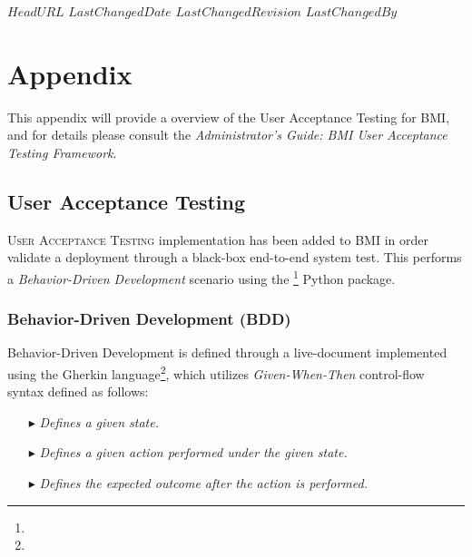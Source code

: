 \svnidlong
{$HeadURL$}
{$LastChangedDate$}
{$LastChangedRevision$}
{$LastChangedBy$}

\chapter{Appendix}

\begin{introduction}
  This appendix will provide a overview of the User Acceptance Testing for BMI, and for details please consult the \emph{Administrator's Guide: BMI User Acceptance Testing Framework}.
\end{introduction}

\section{User Acceptance Testing}

\lettrine[nindent=-1pt]{U}{ser Acceptance Testing} implementation has been added to BMI in order validate a deployment through a black-box end-to-end system test.  This performs a \emph{Behavior-Driven Development} scenario using the \footnote{} Python package.  

\subsection{Behavior-Driven Development (BDD)}

Behavior-Driven Development is defined through a live-document implemented using the Gherkin language\footnote{}, which utilizes \emph{Given-When-Then} control-flow syntax defined as follows: \\

\begin{itemize}
\item[\code{Given }$\blacktriangleright$\hspace{-12mm}] \hspace{10mm}\emph{Defines a given state.}
\item[\code{When }$\blacktriangleright$\hspace{-12mm}] \hspace{10mm}\emph{Defines a given action performed under the given state.}
\item[\code{Then }$\blacktriangleright$\hspace{-12mm}] \hspace{10mm}\emph{Defines the expected outcome after the action is performed.} \\
\end{itemize}


